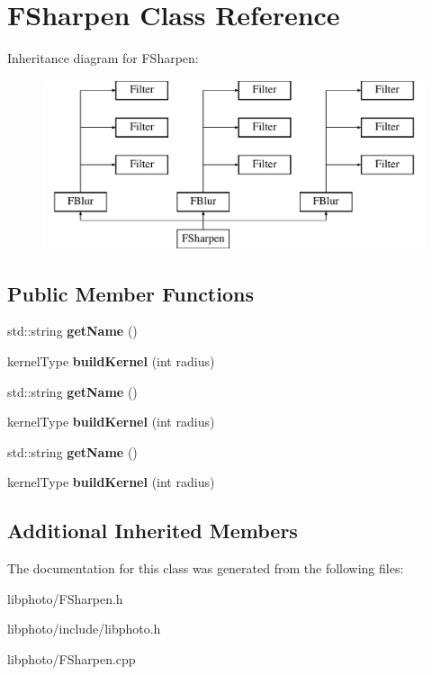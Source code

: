 \hypertarget{classFSharpen}{\section{F\-Sharpen Class Reference}
\label{classFSharpen}
}
Inheritance diagram for F\-Sharpen\-:\begin{figure}[H]
\begin{center}
\leavevmode
\includegraphics[height=5.000000cm]{classFSharpen}
\end{center}
\end{figure}
\subsection*{Public Member Functions}
\begin{DoxyCompactItemize}
\item 
\hypertarget{classFSharpen_ae322ad5626a003ae1e1c6e385dd43ca8}{std\-::string {\bfseries get\-Name} ()}\label{classFSharpen_ae322ad5626a003ae1e1c6e385dd43ca8}

\item 
\hypertarget{classFSharpen_afafd2b34e58d2fb682150be2159d7986}{kernel\-Type {\bfseries build\-Kernel} (int radius)}\label{classFSharpen_afafd2b34e58d2fb682150be2159d7986}

\item 
\hypertarget{classFSharpen_ae322ad5626a003ae1e1c6e385dd43ca8}{std\-::string {\bfseries get\-Name} ()}\label{classFSharpen_ae322ad5626a003ae1e1c6e385dd43ca8}

\item 
\hypertarget{classFSharpen_afafd2b34e58d2fb682150be2159d7986}{kernel\-Type {\bfseries build\-Kernel} (int radius)}\label{classFSharpen_afafd2b34e58d2fb682150be2159d7986}

\item 
\hypertarget{classFSharpen_ae322ad5626a003ae1e1c6e385dd43ca8}{std\-::string {\bfseries get\-Name} ()}\label{classFSharpen_ae322ad5626a003ae1e1c6e385dd43ca8}

\item 
\hypertarget{classFSharpen_afafd2b34e58d2fb682150be2159d7986}{kernel\-Type {\bfseries build\-Kernel} (int radius)}\label{classFSharpen_afafd2b34e58d2fb682150be2159d7986}

\end{DoxyCompactItemize}
\subsection*{Additional Inherited Members}


The documentation for this class was generated from the following files\-:\begin{DoxyCompactItemize}
\item 
libphoto/F\-Sharpen.\-h\item 
libphoto/include/libphoto.\-h\item 
libphoto/F\-Sharpen.\-cpp\end{DoxyCompactItemize}
